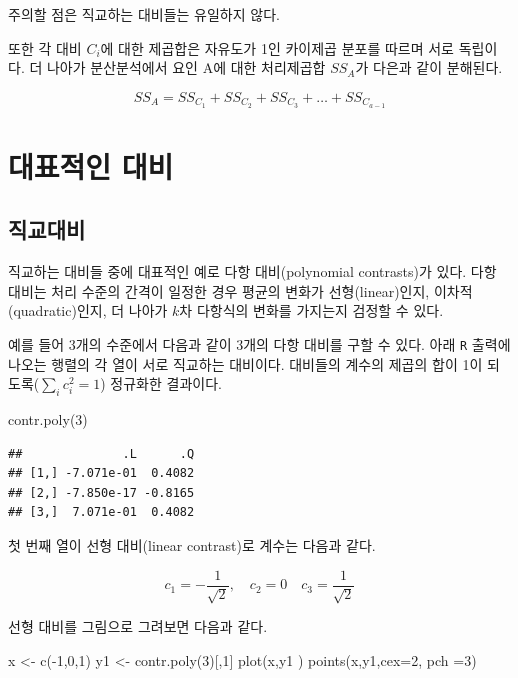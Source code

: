 \documentclass[
]{book}
\newenvironment{Shaded}{\begin{snugshade}}{\end{snugshade}}
\newcommand{\AttributeTok}[1]{\textcolor[rgb]{0.77,0.63,0.00}{#1}}
\newcommand{\DecValTok}[1]{\textcolor[rgb]{0.00,0.00,0.81}{#1}}
\newcommand{\FunctionTok}[1]{\textcolor[rgb]{0.00,0.00,0.00}{#1}}
\newcommand{\NormalTok}[1]{#1}
\newcommand{\OtherTok}[1]{\textcolor[rgb]{0.56,0.35,0.01}{#1}}
\newcommand{\SpecialCharTok}[1]{\textcolor[rgb]{0.00,0.00,0.00}{#1}}
\begin{document}
주의할 점은 직교하는 대비들는 유일하지 않다.

또한 각 대비 \(C_{i}\)에 대한 제곱합은 자유도가 1인 카이제곱 분포를 따르며 서로 독립이다. 더 나아가
분산분석에서 요인 A에 대한 처리제곱합 \(SS_A\)가 다은과 같이 분해된다.

\[ SS_A = SS_{C_1}  + SS_{C_2} + SS_{C_3} + \dots + SS_{C_{a-1}} \]

\hypertarget{uxb300uxd45cuxc801uxc778-uxb300uxbe44}{%
\section{대표적인 대비}\label{uxb300uxd45cuxc801uxc778-uxb300uxbe44}}

\hypertarget{uxc9c1uxad50uxb300uxbe44}{%
\subsection{직교대비}\label{uxc9c1uxad50uxb300uxbe44}}

직교하는 대비들 중에 대표적인 예로 다항 대비(polynomial contrasts)가 있다. 다항 대비는 처리 수준의 간격이 일정한 경우 평균의 변화가 선형(linear)인지, 이차적(quadratic)인지, 더 나아가 \(k\)차 다항식의 변화를 가지는지 검정할 수 있다.

예를 들어 3개의 수준에서 다음과 같이 3개의 다항 대비를 구할 수 있다. 아래 \texttt{R} 출력에 나오는 행렬의 각 열이 서로 직교하는 대비이다. 대비들의 계수의 제곱의 합이 1이 되도록(\(\sum_i c_i^2=1\)) 정규화한 결과이다.

\begin{Shaded}
\begin{Highlighting}[]
\FunctionTok{contr.poly}\NormalTok{(}\DecValTok{3}\NormalTok{)}
\end{Highlighting}
\end{Shaded}

\begin{verbatim}
##              .L      .Q
## [1,] -7.071e-01  0.4082
## [2,] -7.850e-17 -0.8165
## [3,]  7.071e-01  0.4082
\end{verbatim}

첫 번째 열이 선형 대비(linear contrast)로 계수는 다음과 같다.

\[ c_1= - \frac{1}{\sqrt{2}}, \quad c_2 =0 \quad c_3= \frac{1}{\sqrt{2}} \]

선형 대비를 그림으로 그려보면 다음과 같다.

\begin{Shaded}
\begin{Highlighting}[]
\NormalTok{x }\OtherTok{\textless{}{-}} \FunctionTok{c}\NormalTok{(}\SpecialCharTok{{-}}\DecValTok{1}\NormalTok{,}\DecValTok{0}\NormalTok{,}\DecValTok{1}\NormalTok{)}
\NormalTok{y1 }\OtherTok{\textless{}{-}} \FunctionTok{contr.poly}\NormalTok{(}\DecValTok{3}\NormalTok{)[,}\DecValTok{1}\NormalTok{]}
\FunctionTok{plot}\NormalTok{(x,y1 )}
\FunctionTok{points}\NormalTok{(x,y1,}\AttributeTok{cex=}\DecValTok{2}\NormalTok{, }\AttributeTok{pch =}\DecValTok{3}\NormalTok{)}
\end{Highlighting}
\end{Shaded}
\end{document}
